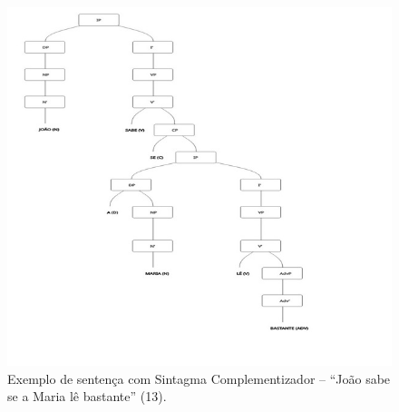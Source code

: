 \documentclass[portuguese]{textolivre}
\begin{document}
\begin{figure}[p]
 \centering
 \includegraphics[width=\textwidth,height=0.85\textheight,keepaspectratio]{fig7.png}
 \caption{Exemplo de sentença com Sintagma Complementizador – “João sabe se a Maria lê bastante” (13).}
 \label{fig7}
\end{figure}
\end{document}
